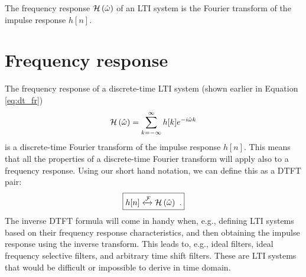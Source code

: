 \fi




\usetikzlibrary{arrows.meta, positioning, quotes}
\begin{marginfigure}
    \begin{center}
    \end{center}
    \caption{The frequency response $\mathcal{H}\left(\hat{\omega}\right)$ of an LTI system is the Fourier transform of the impulse response $h[n]$.}
\end{marginfigure}

\section{Frequency response}

The frequency response of a discrete-time LTI system (shown earlier in Equation \ref{eq:dt_fr})
\begin{equation}
    \mathcal{H}\left(\hat{\omega}\right) = \sum_{k=-\infty}^{\infty} h[k] e^{-i\hat{\omega} k}
\end{equation}
is a discrete-time Fourier transform of the impulse response
$h[n]$. This means that all the properties of a discrete-time Fourier
transform will apply also to a frequency response. Using our short
hand notation, we can define this as a DTFT pair:
\begin{equation}
    \boxed{
        h[n] \xleftrightarrow{\mathcal{F}} \mathcal{H}\left(\hat{\omega}\right)\,\,.
    }
\end{equation}
The inverse DTFT formula will come in handy when, e.g., defining LTI
systems based on their frequency response characteristics, and then
obtaining the impulse response using the inverse transform. This leads
to, e.g., ideal filters, ideal frequency selective filters, and
arbitrary time shift filters. These are LTI systems that would be
difficult or impossible to derive in time domain.

